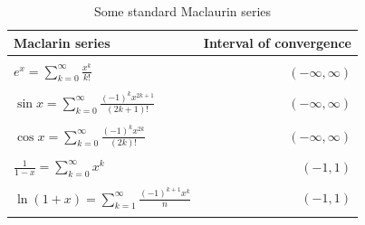\documentclass[extrafontsizes, twoside, a4paper]{memoir}
\theoremstyle{plain}%
\theoremstyle{definition}
\theoremstyle{remark}
\begin{document}
\begin{table}[h]
\centering
\begin{tabular}{lr}
\hline
Maclarin series \quad & \quad Interval of convergence \\
\hline \\
$e^x  = \displaystyle \sum_{k=0}^\infty \frac{x^k}{k!}$ & $(-\infty, \infty)$ \\ \\
$\sin{x}=\displaystyle\sum_{k=0}^\infty \frac{(-1)^k x^{2k+1}}{(2k+1)!}$
& $ (-\infty, \infty)$ \\ \\
$\cos{x}=\displaystyle\sum_{k=0}^\infty \frac{(-1)^k x^{2k}}{(2k)!} $
& $(-\infty, \infty)$ \\ \\
$\frac{1}{1-x}=\displaystyle\sum_{k=0}^\infty x^k$
& $(-1,1) $ \\ \\
$\ln (1+x) =\displaystyle \sum_{k=1}^\infty \frac{(-1)^{k+1} x^k}{n}$
& $(-1,1)$ \\ \\
\hline
\end{tabular}
\caption{Some standard Maclaurin series}
\label{T:Mac}
\end{table}
\strictpagecheck
\newpage
\end{document}
